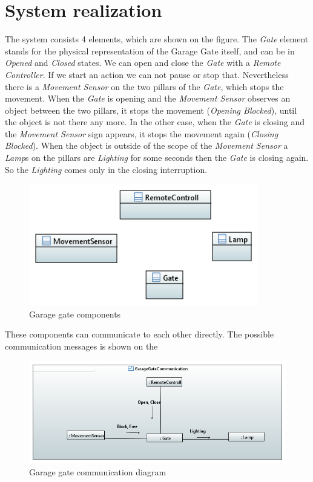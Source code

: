\section{System realization}

The system consists  4 elements, which are shown on the  figure. The \textit{Gate} element stands for the physical representation of the Garage Gate itself, and can be in \textit{Opened} and \textit{Closed} states. We can open and close the \textit{Gate} with a \textit{Remote Controller}. If we start an action we can not pause or stop that. Nevertheless there is a \textit{Movement Sensor} on the two pillars of the \textit{Gate}, which stops the movement. When the \textit{Gate} is opening and the \textit{Movement Sensor} observes an object between the two pillars, it stops the movement (\textit{Opening Blocked}), until the object is not there any more. In the other case, when the \textit{Gate} is closing and the \textit{Movement Sensor} sign appears, it stops the movement again (\textit{Closing Blocked}). When the object is outside of the scope of the \textit{Movement Sensor} a \textit{Lamp}s on the pillars are \textit{Lighting} for some seconds then the \textit{Gate} is closing again.
So the \textit{Lighting} comes only in the closing interruption.

\begin{figure}[!ht]
	\centering
	\includegraphics[width=100mm, keepaspectratio]{figures/component.png}
	\caption{Garage gate components}
	\label{fig:Garage Component}
\end{figure}

These components can communicate to each other directly. The possible communication messages is shown on the 

\begin{figure}[!ht]
	\centering
	\includegraphics[width=150mm, keepaspectratio]{figures/communication.png}
	\caption{Garage gate communication diagram}
	\label{fig:Garage communication}
\end{figure}

